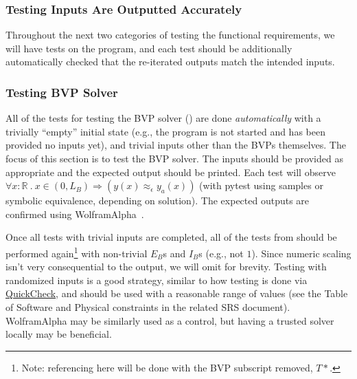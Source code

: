 \documentclass[12pt, titlepage]{article}
\begin{document}
\subsubsection{Testing Inputs Are Outputted Accurately}

Throughout the next two categories of testing the functional requirements, we
will have tests on the program, and each test should be additionally
automatically checked that the re-iterated outputs match the intended inputs.

\subsubsection{Testing BVP Solver}

All of the tests for testing the BVP solver ()
are done \textit{automatically} with a trivially ``empty'' initial state (e.g.,
the program is not started and has been provided no inputs yet), and trivial
inputs other than the BVPs themselves. The focus of this section is to test the
BVP solver. The inputs should be provided as appropriate and the expected output
should be printed. Each test will observe \(\forall x : \mathbb{R} ~.~x \in (0,
L_B) \Rightarrow (y(x) \approx_{\epsilon} y_a(x))\) (with pytest using samples
or symbolic equivalence, depending on solution). The expected outputs are
confirmed using WolframAlpha~\cite{WolframAlpha}.

Once all tests with trivial inputs are completed, all of the tests from
 should be performed again\footnote{Note:
referencing here will be done with the BVP subscript removed, $T*$.} with
non-trivial $E_B$s and $I_B$s (e.g., not $1$). Since numeric scaling isn't very
consequential to the output, we will omit for brevity. Testing with randomized
inputs is a good strategy, similar to how testing is done via
\href{https://hackage.haskell.org/package/QuickCheck}{QuickCheck}, and should be
used with a reasonable range of values (see the Table of Software and Physical
constraints in the related SRS document). WolframAlpha may be similarly used as
a control, but having a trusted solver locally may be beneficial.
\end{document}
